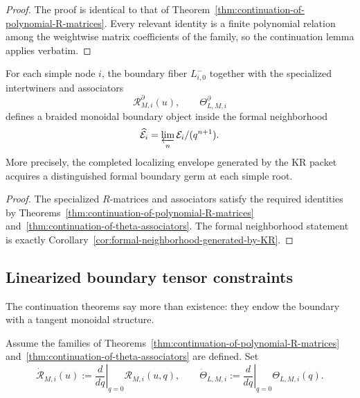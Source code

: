 \begin{proof}
The proof is identical to that of
Theorem~\ref{thm:continuation-of-polynomial-R-matrices}. Every relevant
identity is a finite polynomial relation among the weightwise matrix
coefficients of the family, so the continuation lemma applies verbatim.
\end{proof}

\begin{corollary}
\ClaimStatusProvedHere
\label{cor:formal-braided-boundary-germ}
For each simple node $i$, the boundary fiber $L^-_{i,0}$ together with the
specialized intertwiners and associators
\begin{equation}
\mathscr R_{M,i}^{\partial}(u),
\qquad
\Theta^{\partial}_{L,M,i}
\end{equation}
defines a braided monoidal boundary object inside the formal neighborhood
\begin{equation}
\widehat{\mathcal E}_i=\varprojlim_n \mathcal E_i/(q^{n+1}).
\end{equation}
More precisely, the completed localizing envelope generated by the KR
packet acquires a distinguished formal boundary germ at each simple root.
\end{corollary}

\begin{proof}
The specialized $R$-matrices and associators satisfy the required
identities by
Theorems~\ref{thm:continuation-of-polynomial-R-matrices}
and~\ref{thm:continuation-of-theta-associators}. The formal neighborhood
statement is exactly Corollary~\ref{cor:formal-neighborhood-generated-by-KR}.
\end{proof}

\subsection{Linearized boundary tensor constraints}

The continuation theorems say more than existence: they endow the boundary
with a tangent monoidal structure.

\begin{definition}
\label{def:boundary-tangent-tensors}
Assume the families of
Theorems~\ref{thm:continuation-of-polynomial-R-matrices}
and~\ref{thm:continuation-of-theta-associators} are defined. Set
\begin{equation}
\dot{\mathscr R}_{M,i}(u)
:=
\left.\frac{d}{dq}\right|_{q=0}\mathscr R_{M,i}(u,q),
\qquad
\dot\Theta_{L,M,i}
:=
\left.\frac{d}{dq}\right|_{q=0}\Theta_{L,M,i}(q).
\end{equation}
\end{definition}

